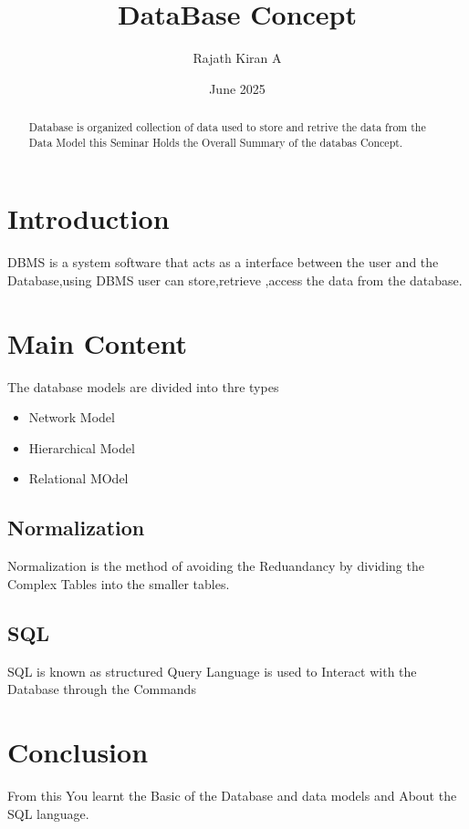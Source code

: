 \documentclass{article}
\title{DataBase Concept}
\author{Rajath Kiran A}
\date{June 2025}
\begin{document}
	\maketitle
	\begin{abstract}
		Database is organized collection of data used to store and retrive the data from the Data Model this Seminar Holds the Overall Summary of the databas Concept.\cite{kopka2003guide}
	\end{abstract}
	\section{Introduction}
	DBMS is a system software that acts as a interface between the user and the Database,using DBMS user can store,retrieve ,access the data from the database.
	\section{Main Content}
	The database models are divided into thre types
	\begin{itemize}
		\item Network Model
		\item Hierarchical Model
		\item Relational MOdel
	\end{itemize}
	\subsection{Normalization}
	Normalization is the  method of avoiding the Reduandancy by  dividing the Complex Tables into the smaller tables.
	\subsection{SQL}
	SQL is known as structured Query Language is used to Interact with the Database through the Commands
	\section{Conclusion}
	From this You learnt the Basic of the Database and data models and About the SQL language\cite{mittelbach2004latex}.
	
	
\end{document}

